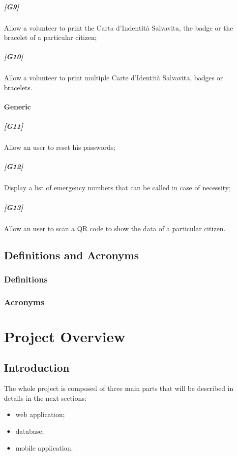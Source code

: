 \documentclass[oneside]{book}
\begin{document}
\paragraph{[G9]} Allow a volunteer to print the Carta d'Indentità Salvavita, the badge or the bracelet of a particular citizen;
\paragraph{[G10]} Allow a volunteer to print multiple Carte d'Identità Salvavita, badges or bracelets.

\subsubsection{Generic}
\paragraph{[G11]} Allow an user to reset his passwords;
\paragraph{[G12]} Display a list of emergency numbers that can be called in case of necessity;
\paragraph{[G13]} Allow an user to scan a QR code to show the data of a particular citizen.

\section{Definitions and Acronyms}
\subsection{Definitions}

\subsection{Acronyms}


\chapter{Project Overview}
\section{Introduction}
The whole project is composed of three main parts that will be described in details in the next sections:
\begin{itemize}
\item web application;
\item database;
\item mobile application.
\end{itemize}
\end{document}
